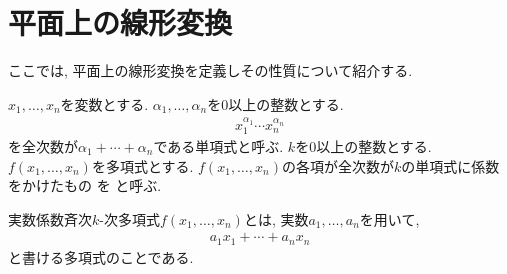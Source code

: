 \section{平面上の線形変換}
ここでは, 平面上の線形変換を定義しその性質について紹介する.
\begin{definition}
  \label{def:homogepolynomial}
  $x_1,\ldots,x_n$を変数とする.
  $\alpha_1,\ldots,\alpha_n$を$0$以上の整数とする.
  \begin{align*}
    x_1^{\alpha_1}\cdots x_n^{\alpha_n}
  \end{align*}
  を全次数が$\alpha_1+\cdots+\alpha_n$である単項式と呼ぶ.
  $k$を$0$以上の整数とする.
  $f(x_1,\ldots, x_n)$を多項式とする.
  $f(x_1,\ldots, x_n)$の各項が全次数が$k$の単項式に係数をかけたもの
  を
  と呼ぶ.
\end{definition}
\begin{example}
  実数係数斉次$k$-次多項式$f(x_1,\ldots,x_n)$とは,
  実数$a_1,\ldots,a_n$を用いて,
  \begin{align*}
    a_1x_1+\cdots+a_nx_n
  \end{align*}
  と書ける多項式のことである.
\end{example}

